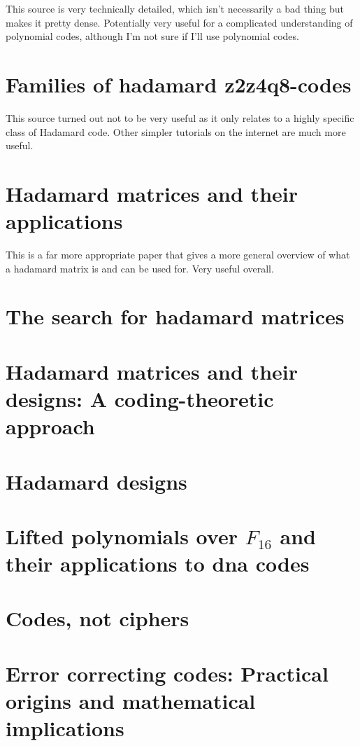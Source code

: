 \documentclass{article}
\begin{document}
    This source is very technically detailed, which isn't necessarily a bad
    thing but makes it pretty dense. Potentially very useful for a complicated
    understanding of polynomial codes, although I'm not sure if I'll use
    polynomial codes.

    \section{Families of hadamard z2z4q8-codes \citep*{HadamardZ2Z2012RioRifa}}

    This source turned out not to be very useful as it only relates to a highly
    specific class of Hadamard code. Other simpler tutorials on the internet
    are much more useful.

    \section{Hadamard matrices and their applications \citep*{HadamardMatrices1978HedayatWallis}}

    This is a far more appropriate paper that gives a more general overview of
    what a hadamard matrix is and can be used for. Very useful overall.

    \section{The search for hadamard matrices \citep*{HadamardSearch1963GolombBaumert}}

    \section{Hadamard matrices and their designs: A coding-theoretic approach \citep*{HadamardCodingTheoretic1992AssmusKey}}

    \section{Hadamard designs \citep*{HadamardDesigns1972Spence}}

    \section{Lifted polynomials over ${F}_{16}$ and their applications to dna codes \citep*{PolynomialDNA2013OztasSiap}}

    \section{Codes, not ciphers \citep*{CodesCiphers1010Baylis}}

    \section{Error correcting codes: Practical origins and mathematical implications \citep*{CodesOrigins1978Pless}}



\end{document}
